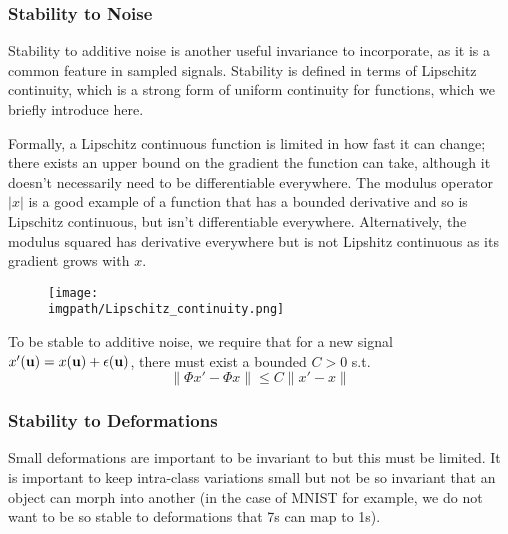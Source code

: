 \subsubsection{Stability to Noise}
  Stability to additive noise is another useful invariance to incorporate,
  as it is a common feature in sampled signals. Stability is defined in terms of
  Lipschitz continuity, which is a strong form of uniform continuity for
  functions, which we briefly introduce here.

  Formally, a Lipschitz continuous function is limited in how fast it can change;
  there exists an upper bound on the gradient the function can take, although it
  doesn't necessarily need to be differentiable everywhere. The modulus operator
  $|x|$ is a good example of a function that has a bounded derivative and so is
  Lipschitz continuous, but isn't differentiable everywhere. Alternatively, the
  modulus squared has derivative everywhere but is not Lipshitz continuous as
  its gradient grows with $x$.

  \begin{figure}
    \begin{center}
      \texttt{[image: \\imgpath/Lipschitz\_continuity.png]}
      \label{fig:lipschitz}
    \end{center}
  \end{figure}

  To be stable to additive noise, we require that for
  a new signal $x'(\mathbf{u}) = x(\mathbf{u}) + \epsilon(\mathbf{u})$, there must exist
  a bounded $C>0$ s.t.
  \begin{equation}\label{eq:ch2:scat_noise_stability}
    \|\Phi x' - \Phi x\| \leq C \|x' - x\|
  \end{equation}

\subsubsection{Stability to Deformations}
  Small deformations are important to be invariant to but this must be
  limited. It is important to keep intra-class variations small but not be so
  invariant that an object can morph into another (in the case of MNIST for
  example, we do not want to be so stable to deformations that 7s can map to
  1s).

